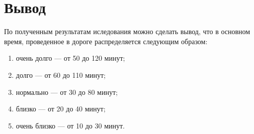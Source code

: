 \section{Вывод}
По полученным результатам иследования можно сделать вывод, что в основном время, проведенное в дороге распределяется следующим образом: 
\begin{enumerate}[label=\arabic*), itemindent=1em]
	\item очень долго --- от 50 до 120 минут;
	\item долго --- от 60 до 110 минут;
	\item нормально --- от 30 до 80 минут;
	\item близко --- от 20 до 40 минут;
	\item очень близко --- от 10 до 30 минут.
\end{enumerate}
